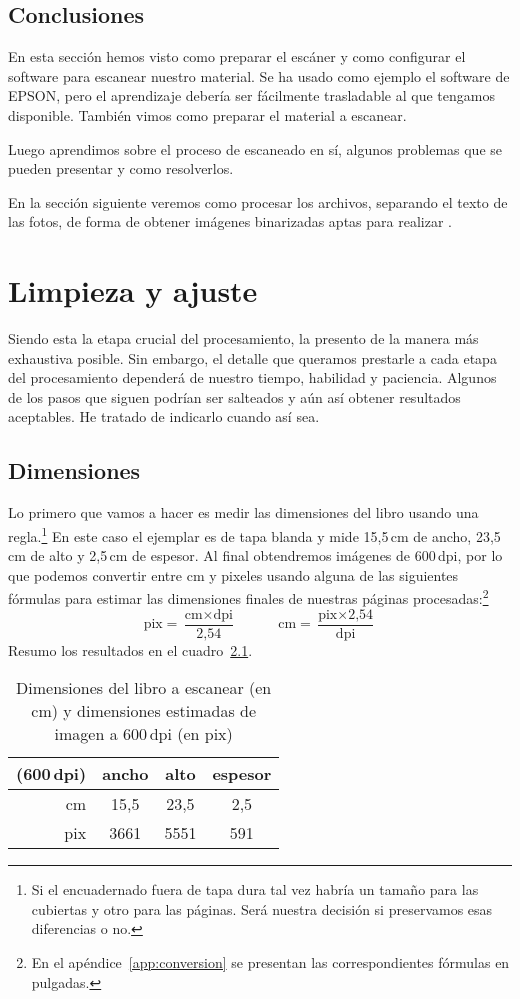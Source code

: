 \documentclass[%
	a5paper,
	10pt,
	twoside,
	openright,
	final,
]{memoir}
\begin{document}
{	\section{Conclusiones} En esta sección hemos visto como preparar el escáner y como configurar el software para escanear nuestro material. Se ha usado como ejemplo el software de EPSON, pero el aprendizaje debería ser fácilmente trasladable al que tengamos disponible. También vimos como preparar el material a escanear.

	Luego aprendimos sobre el proceso de escaneado en sí, algunos problemas que se pueden presentar y como resolverlos.

	En la sección siguiente veremos como procesar los archivos, separando el texto de las fotos, de forma de obtener imágenes binarizadas aptas para realizar \ocr.

	\chapter{Limpieza y ajuste\label{sec:cleanAdjust}} Siendo esta la etapa crucial del procesamiento, la presento de la manera más exhaustiva posible. Sin embargo, el detalle que queramos prestarle a cada etapa del procesamiento dependerá de nuestro tiempo, habilidad y paciencia. Algunos de los pasos que siguen podrían ser salteados y aún así obtener resultados aceptables. He tratado de indicarlo cuando así sea.

	\section{Dimensiones\label{sec:cleanAdjustDimensions}} Lo primero que vamos a hacer es medir las dimensiones del libro usando una regla.\footnote{Si el encuadernado fuera de tapa dura tal vez habría un tamaño para las cubiertas y otro para las páginas. Será nuestra decisión si preservamos esas diferencias o no.} En este caso el ejemplar es de tapa blanda y mide 15,5\,cm de ancho, 23,5\,cm de alto y 2,5\,cm de espesor. Al final obtendremos imágenes de 600\,dpi, por lo que podemos convertir entre cm y pixeles usando alguna de las siguientes fórmulas para estimar las dimensiones finales de nuestras páginas procesadas:\footnote{En el apéndice~\ref{app:conversion} se presentan las correspondientes fórmulas en pulgadas.}
	\[
	\text{pix} = \frac{\text{cm} \times \text{dpi}}{\text{2,54}}\hspace{3em} \text{cm} = \frac{\text{pix} \times \text{2,54}}{\text{dpi}}
	\]
	Resumo los resultados en el cuadro~\ref{tab:bookDimensions}.
	\begin{table}
		\centering
		\begin{tabular}{rccc}
			\toprule
			(600\,dpi) & ancho & alto & espesor \\
			\midrule
			cm  & 15,5 & 23,5 & 2,5 \\
			pix & 3661 & 5551 & 591 \\
			\bottomrule
		\end{tabular}
		\caption{Dimensiones del libro a escanear (en cm) y dimensiones estimadas de imagen a 600\,dpi (en pix)\label{tab:bookDimensions}}
	\end{table}

}
\end{document}
